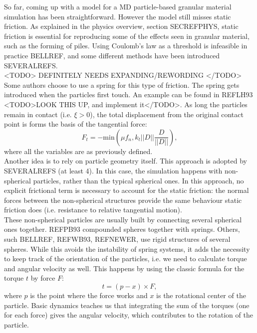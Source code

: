 So far, coming up with a model for a MD particle-based granular material simulation has been straightforward. However the model still misses static friction. As explained in the physics overview, section SECREFPHYS, static friction is essential for reproducing some of the effects seen in granular material, such as the forming of piles. Using Coulomb's law as a threshold is infeasible in practice BELLREF, and some different methods have been introduced SEVERALREFS.\\

<TODO> DEFINITELY NEEDS EXPANDING/REWORDING </TODO>
Some authors choose to use a spring for this type of friction. The spring gets introduced when the particles first touch. An example can be found in REFLH93 <TODO>LOOK THIS UP, and implement it</TODO>. As long the particles remain in contact (i.e. $\xi > 0$), the total displacement from the original contact point is forms the basis of the tangential force:
\begin{equation}
F_t = - \mathrm{min}(\mu f_n, k_t ||D|| \frac{D}{||D||}),
\end{equation} 
where all the variables are as previously defined.\\

Another idea is to rely on particle geometry itself. This approach is adopted by SEVERALREFS (at least 4). In this case, the simulation happens with non-spherical particles, rather than the typical spherical ones. In this approach, no explicit frictional term is necessary to account for the static friction: the normal forces between the non-spherical structures provide the same behaviour static friction does (i.e. resistance to relative tangential motion).\\

These non-spherical particles are usually built by connecting several spherical ones together. REFPB93 compounded spheres together with springs. Others, such BELLREF, REFWB93, REFNEWER, use rigid structures of several spheres. While this avoids the instability of spring systems, it adds the necessity to keep track of the orientation of the particles, i.e. we need to calculate torque and angular velocity as well. This happens by using the classic formula for the  torque $t$ by force $F$:
\begin{equation}
t = (p - x) \times F,
\end{equation} 
where $p$ is the point where the force works and $x$ is the rotational center of the particle. Basic dynamics teaches us that integrating the sum of the torques (one for each force) gives the angular velocity, which contributes to the rotation of the particle.\\

